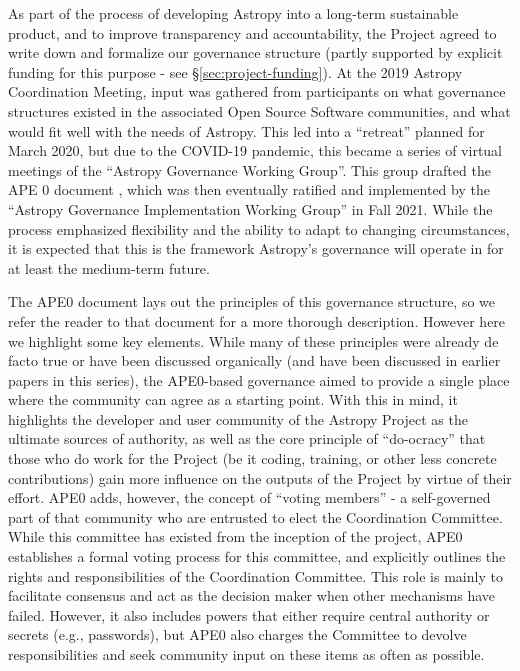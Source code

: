 \documentclass[modern]{aastex631}
\begin{document}
As part of the process of developing Astropy into a long-term sustainable
product, and to improve transparency and accountability, the Project agreed to
write down and formalize our governance structure (partly supported by explicit
funding for this purpose - see \S \ref{sec:project-funding}). At the 2019
Astropy Coordination Meeting, input was gathered from participants on what governance
structures existed in the associated Open Source Software communities, and what
would fit well with the needs of Astropy. This led into a ``retreat'' planned
for March 2020, but due to the COVID-19 pandemic, this became a series of
virtual meetings of the ``Astropy Governance Working Group''.  This group
drafted the APE 0 document \citep{ape0}, which was then eventually ratified and
implemented by the ``Astropy Governance Implementation Working Group'' in Fall
2021. While the process emphasized flexibility and the ability to adapt to
changing circumstances, it is expected that this is the framework Astropy's
governance will operate in for at least the medium-term future.

The APE0 \citep{ape0} document lays out the principles of this governance
structure, so we refer the reader to that document for a more thorough
description.  However here we highlight some key elements. While many of these
principles were already de facto true or have been discussed organically (and
have been discussed in earlier papers in this series), the APE0-based governance
aimed to provide a single place where the community can agree as a starting
point. With this in mind, it highlights the developer and user community of the
Astropy Project as the ultimate sources of authority, as well as the core
principle of ``do-ocracy'' that those who do work for the Project (be it coding,
training, or other less concrete contributions) gain more influence on the
outputs of the Project by virtue of their effort.  APE0 adds, however, the
concept of ``voting members'' - a self-governed part of that community who are
entrusted to elect the Coordination Committee. While this committee has existed
from the inception of the project, APE0 establishes a formal voting process for
this committee, and explicitly outlines the rights and responsibilities of the
Coordination Committee. This role is mainly to facilitate consensus and act as
the decision maker when other mechanisms have failed.  However, it also includes
powers that either require central authority or secrets (e.g., passwords), but
APE0 also charges the Committee to devolve responsibilities and seek community
input on these items as often as possible.
\end{document}
